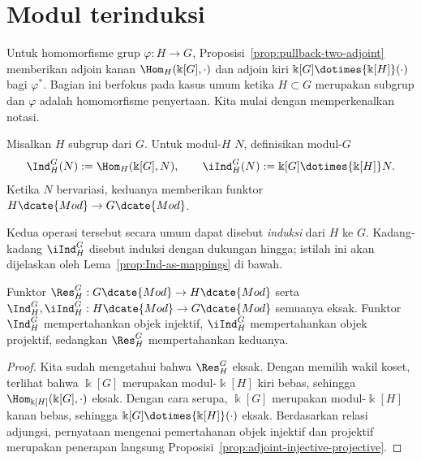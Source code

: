 
\section{Modul terinduksi}\label{sec:induced-module}
\hypertarget{o014.aljabr2.chapter6.induced-modules}{ }

Untuk homomorfisme grup $\varphi:H\to G$,
Proposisi~\ref{prop:pullback-two-adjoint} memberikan adjoin kanan
$\Hom_H(\Bbbk[G],\cdot)$ dan adjoin kiri
$\Bbbk[G]\dotimes{\Bbbk[H]}(\cdot)$ bagi $\varphi^*$. Bagian ini berfokus
pada kasus umum ketika $H\subset G$ merupakan subgrup dan $\varphi$ adalah
homomorfisme penyertaan. Kita mulai dengan memperkenalkan notasi.

\begin{definition}\label{def:induced-module}
	Misalkan $H$ subgrup dari $G$. Untuk modul-$H$ $N$, definisikan
	modul-$G$
	\[ \Ind^G_H(N):=\Hom_H(\Bbbk[G],N),\qquad
	\iInd^G_H(N):=\Bbbk[G]\dotimes{\Bbbk[H]}N. \]
	Ketika $N$ bervariasi, keduanya memberikan funktor
	$H\dcate{Mod}\to G\dcate{Mod}$.
\end{definition}

Kedua operasi tersebut secara umum dapat disebut \emph{induksi} dari $H$ ke
$G$. Kadang-kadang $\iInd^G_H$ disebut induksi dengan dukungan hingga; istilah
ini akan dijelaskan oleh Lema~\ref{prop:Ind-as-mappings} di bawah.

\begin{proposition}\label{prop:Ind-preservation}
	Funktor $\Res^G_H:G\dcate{Mod}\to H\dcate{Mod}$ serta
	$\Ind^G_H,\iInd^G_H:H\dcate{Mod}\to G\dcate{Mod}$ semuanya eksak.
	Funktor $\Ind^G_H$ mempertahankan objek injektif,
	$\iInd^G_H$ mempertahankan objek projektif, sedangkan $\Res^G_H$
	mempertahankan keduanya.
\end{proposition}
\begin{proof}
	Kita sudah mengetahui bahwa $\Res^G_H$ eksak. Dengan memilih wakil koset,
	terlihat bahwa $\Bbbk[G]$ merupakan modul-$\Bbbk[H]$ kiri bebas, sehingga
	$\Hom_{\Bbbk[H]}(\Bbbk[G],\cdot)$ eksak. Dengan cara serupa,
	$\Bbbk[G]$ merupakan modul-$\Bbbk[H]$ kanan bebas, sehingga
	$\Bbbk[G]\dotimes{\Bbbk[H]}(\cdot)$ eksak. Berdasarkan relasi adjungsi,
	pernyataan mengenai pemertahanan objek injektif dan projektif merupakan
	penerapan langsung Proposisi~\ref{prop:adjoint-injective-projective}.
\end{proof}

